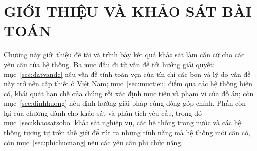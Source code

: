 %

\chapter{GIỚI THIỆU VÀ KHẢO SÁT BÀI TOÁN}
\label{chap:khaosat}
\label{chap:gioithieu}

Chương này giới thiệu đề tài và trình bày kết quả khảo sát làm căn cứ cho các yêu cầu của hệ thống. Ba mục đầu đi từ vấn đề tới hướng giải quyết: mục~\ref{sec:datvande} nêu vấn đề tính toàn vẹn của tín chỉ các-bon và lý do vấn đề này trở nên cấp thiết ở Việt Nam; mục~\ref{sec:muctieu} điểm qua các hệ thống hiện có, khái quát hạn chế của chúng rồi xác định mục tiêu và phạm vi của đồ án; còn mục~\ref{sec:dinhhuong} nêu định hướng giải pháp cùng đóng góp chính. Phần còn lại của chương dành cho khảo sát và phân tích yêu cầu, trong đó mục~\ref{sec:khaosatsobo} khảo sát nghiệp vụ, các hệ thống trong nước và các hệ thống tương tự trên thế giới để rút ra những tính năng mà hệ thống mới cần có, còn mục~\ref{sec:phichucnang} nêu các yêu cầu phi chức năng.

